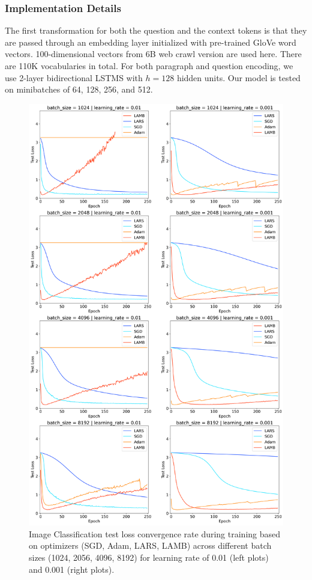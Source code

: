 \subsubsection{Implementation Details}

The first transformation for both the question and the context tokens is that they are passed through an embedding layer initialized with pre-trained GloVe word vectors. 100-dimensional vectors from 6B web crawl version are used here. There are 110K vocabularies in total. For both paragraph and question encoding, we use 2-layer bidirectional LSTMS with $h = 128$ hidden units. Our model is tested on minibatches of 64, 128, 256, and 512. 

\begin{figure}[!t]
    \centering
    \includegraphics[width=0.7\linewidth, height=0.7\textheight]{img/eminst_all_figures.png}
    \caption{Image Classification test loss convergence rate during training based on optimizers (SGD, Adam, LARS, LAMB) across different batch sizes (1024, 2056, 4096, 8192) for learning rate of 0.01 (left plots) and 0.001 (right plots). }
    \label{fig:cv_plots}
\end{figure}

